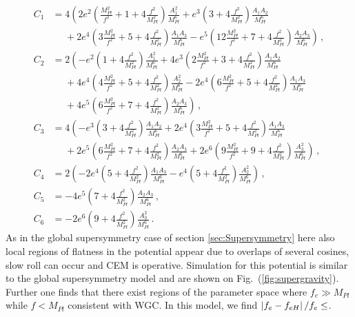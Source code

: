 \documentclass[12pt]{article}
\begin{document}
\begin{equation} \label{eq:supergravity:Vslow3Coefficients}
  \begin{aligned}
    C_1 &=   4 \left(
        2 e^2 \left(   \frac{M_{Pl}^2}{f^2} + 1 + 4 \frac{f^2}{M_{Pl}^2}\right) \frac{A_1^2  }{M_{Pl}^6}
      +   e^3 \left(                          3 + 4 \frac{f^2}{M_{Pl}^2}\right) \frac{A_1 A_2}{M_{Pl}^6}\right.\\
      &~~~~~~ \left.{}
      + 2 e^4 \left( 3 \frac{M_{Pl}^2}{f^2} + 5 + 4 \frac{f^2}{M_{Pl}^2}\right) \frac{A_1 A_3}{M_{Pl}^6}
      -   e^5 \left(12 \frac{M_{Pl}^2}{f^2} + 7 + 4 \frac{f^2}{M_{Pl}^2}\right) \frac{A_2 A_3}{M_{Pl}^6}
    \right)\,,\\
    C_2 &=   2 \left(
      -   e^2 \left(                          1 + 4 \frac{f^2}{M_{Pl}^2}\right) \frac{A_1^2  }{M_{Pl}^6}
      + 4 e^3 \left( 2 \frac{M_{Pl}^2}{f^2} + 3 + 4 \frac{f^2}{M_{Pl}^2}\right) \frac{A_1 A_2}{M_{Pl}^6}\right.\\
      &~~~~~~ \left.{}
      + 4 e^4 \left( 4 \frac{M_{Pl}^2}{f^2} + 5 + 4 \frac{f^2}{M_{Pl}^2}\right) \frac{A_2^2  }{M_{Pl}^6}
      - 2 e^4 \left( 6 \frac{M_{Pl}^2}{f^2} + 5 + 4 \frac{f^2}{M_{Pl}^2}\right) \frac{A_1 A_3}{M_{Pl}^6}\right.\\
      &~~~~~~ \left.{}
      + 4 e^5 \left( 6 \frac{M_{Pl}^2}{f^2} + 7 + 4 \frac{f^2}{M_{Pl}^2}\right) \frac{A_2 A_3}{M_{Pl}^6}
    \right)\,,\\
    C_3 &=   4 \left(
      -   e^3 \left(                          3 + 4 \frac{f^2}{M_{Pl}^2}\right) \frac{A_1 A_2}{M_{Pl}^6}
      + 2 e^4 \left( 3 \frac{M_{Pl}^2}{f^2} + 5 + 4 \frac{f^2}{M_{Pl}^2}\right) \frac{A_1 A_3}{M_{Pl}^6}\right.\\
      &~~~~~~ \left.{}
      + 2 e^5 \left( 6 \frac{M_{Pl}^2}{f^2} + 7 + 4 \frac{f^2}{M_{Pl}^2}\right) \frac{A_2 A_3}{M_{Pl}^6}
      + 2 e^6 \left( 9 \frac{M_{Pl}^2}{f^2} + 9 + 4 \frac{f^2}{M_{Pl}^2}\right) \frac{A_3^2  }{M_{Pl}^6}
    \right)\,,\\
    C_4 &=   2 \left(
      - 2 e^4 \left(                          5 + 4 \frac{f^2}{M_{Pl}^2}\right) \frac{A_1 A_3}{M_{Pl}^6}
      -   e^4 \left(                          5 + 4 \frac{f^2}{M_{Pl}^2}\right) \frac{A_2^2  }{M_{Pl}^6}
    \right)\,,\\
    C_5 &= - 4
          e^5 \left(                          7 + 4 \frac{f^2}{M_{Pl}^2}\right) \frac{A_2 A_3}{M_{Pl}^6}\,,\\
    C_6 &= - 2
          e^6 \left(                          9 + 4 \frac{f^2}{M_{Pl}^2}\right) \frac{A_3^2  }{M_{Pl}^6}\,.
  \end{aligned}
\end{equation}
As in the global supersymmetry case of section \ref{sec:Supersymmetry} here also local regions of flatness in the potential appear due to overlaps of several cosines, slow roll can occur and CEM is operative.
Simulation for this potential is similar to the global supersymmetry model and are shown on Fig.~(\ref{fig:supergravity}).
Further one finds that there exist regions of the parameter space where $f_e \gg M_{Pl}$ while $f < M_{Pl}$ consistent with WGC.
In this model, we find $\left|f_e - f_{eH}\right| / f_e \le \protect$.
\end{document}
